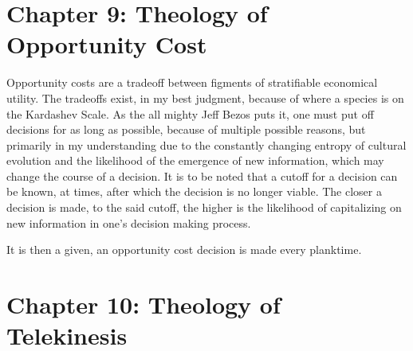 \documentclass[ebook,12pt,oneside,openany]{memoir}
\begin{document}
\chapter*{Chapter 9: Theology of Opportunity Cost}


\indent \indent Opportunity costs are a tradeoff between figments of stratifiable economical utility. The tradeoffs exist, in my best judgment, because of where a species is on the Kardashev Scale. As the all mighty Jeff Bezos puts it, one must put off decisions for as long as possible, because of multiple possible reasons, but primarily in my understanding due to the constantly changing entropy of cultural evolution and the likelihood of the emergence of new information, which may change the course of a decision. It is to be noted that a cutoff for a decision can be known, at times, after which the decision is no longer viable. The closer a decision is made, to the said cutoff, the higher is the likelihood of capitalizing on new information in one's decision making process.

\indent It is then a given, an opportunity cost decision is made every planktime.
\chapter*{Chapter 10: Theology of Telekinesis}


\indent \indent \vspace*{\fill} %


\vspace*{\fill} %
\end{document}
